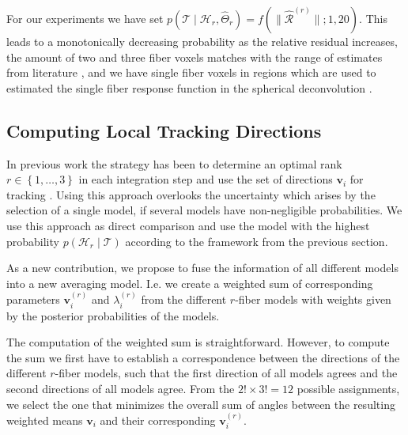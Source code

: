 For our experiments we have set $p \left(  \mathcal{T} \mid \mathcal{H}_r,
\hat{\Theta}_r \right) = f \left(  \| \hat{\mathcal{R}}^{\left( r \right)} \| ; 1,20
\right)$. This leads to a monotonically decreasing probability as the relative
residual increases, the amount of two and three fiber voxels matches with the
range of estimates from literature \cite{Jeurissen:2012, Schultz:MICCAI12}, and we have single fiber voxels in regions
which are used to estimated the single fiber response function in the spherical
deconvolution \cite{TOURNIER20071459}.

\subsection{Computing Local Tracking Directions}
In previous work the strategy has been to determine an optimal rank $r \in
\left\{ 1,\dots , 3 \right\}$ in each integration step and use the set of
directions $\mathbf{v}_i$ for tracking \cite{Anekele:CARS2017}. Using this
approach overlooks the uncertainty which arises by the selection of a single
model, if several models have non-negligible probabilities. We use this approach
as direct comparison and use the model with the highest probability $p \left(
 \mathcal{H}_r \mid \mathcal{T} \right)$ according to the framework from the
 previous section.
 
As a new contribution, we propose to fuse the information of all different
models into a new averaging model. I.e. we create a weighted sum of
corresponding parameters $\mathbf{v}_i^{\left( r \right)}$ and
$\lambda_i^{\left( r \right)}$ from the different
$r$-fiber models with weights given by the posterior probabilities of the
models.

The computation of the weighted sum is straightforward. However, to compute the
sum we first have to establish a correspondence between the directions of the
different $r$-fiber models, such that the first direction of all models agrees
and the second directions of all models agree. From the $2! \times 3! =12$ possible assignments, we
select the one that minimizes the overall sum of angles between the resulting
weighted means $\mathbf{v}_i$ and their corresponding $\mathbf{v}_i^{\left( r
\right)}$.
